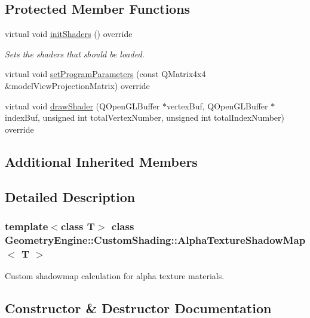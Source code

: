 \subsection*{Protected Member Functions}
\begin{DoxyCompactItemize}
\item 
\mbox{\label{class_geometry_engine_1_1_custom_shading_1_1_alpha_texture_shadow_map_a8dcf554907128b18251440ef9bbd25eb}} 
virtual void \mbox{\hyperlink{class_geometry_engine_1_1_custom_shading_1_1_alpha_texture_shadow_map_a8dcf554907128b18251440ef9bbd25eb}{init\+Shaders}} () override
\begin{DoxyCompactList}\small\item\em Sets the shaders that should be loaded. \end{DoxyCompactList}\item 
virtual void \mbox{\hyperlink{class_geometry_engine_1_1_custom_shading_1_1_alpha_texture_shadow_map_a32014c932093151182926d6d681314de}{set\+Program\+Parameters}} (const Q\+Matrix4x4 \&model\+View\+Projection\+Matrix) override
\item 
virtual void \mbox{\hyperlink{class_geometry_engine_1_1_custom_shading_1_1_alpha_texture_shadow_map_a338fc51d0712fa02fa4d23baa4fa2daa}{draw\+Shader}} (Q\+Open\+G\+L\+Buffer $\ast$vertex\+Buf, Q\+Open\+G\+L\+Buffer $\ast$index\+Buf, unsigned int total\+Vertex\+Number, unsigned int total\+Index\+Number) override
\end{DoxyCompactItemize}
\subsection*{Additional Inherited Members}


\subsection{Detailed Description}
\subsubsection*{template$<$class T$>$\newline
class Geometry\+Engine\+::\+Custom\+Shading\+::\+Alpha\+Texture\+Shadow\+Map$<$ T $>$}

Custom shadowmap calculation for alpha texture materials. 

\subsection{Constructor \& Destructor Documentation}
\mbox{\label{class_geometry_engine_1_1_custom_shading_1_1_alpha_texture_shadow_map_a16e60f631c844c7579e9f5070bfcb02f}} 
